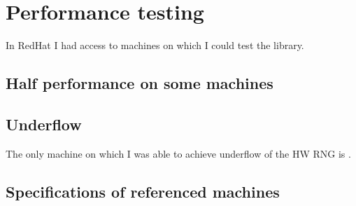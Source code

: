 \chapter{Performance testing} \label{sec:performance}
In RedHat I had access to machines on which I could test the library. 


\section{Half performance on some machines}

\section{Underflow}
The only machine on which I was able to achieve underflow of the HW RNG is .


\section{Specifications of referenced machines}

